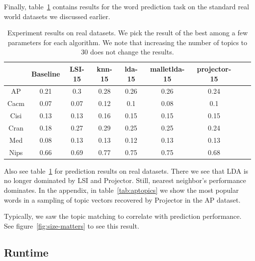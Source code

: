 Finally, table~\ref{tab:real} contains results for the word prediction
task on the standard real world datasets we discussed earlier.

\begin{table}[ht]
{\tiny

\begin{tabular}{|c|c|c|c|c|c|c|c|c|}
\hline 
 &Baseline &LSI-15 &knn-15 &lda-15 &malletlda-15 &projector-15 \\
 \hline 
AP &0.21 &0.3 &0.28 &0.26 &0.26 &0.24 \\
 \hline 
Cacm &0.07 &0.07 &0.12 &0.1 &0.08 &0.1 \\
 \hline 
Cisi &0.13 &0.13 &0.16 &0.15 &0.15 &0.15 \\
 \hline 
Cran &0.18 &0.27 &0.29 &0.25 &0.25 &0.24 \\
 \hline 
Med &0.08 &0.13 &0.13 &0.12 &0.13 &0.13 \\
 \hline 
Nips &0.66 &0.69 &0.77 &0.75 &0.75 &0.68 \\
 \hline 

\end{tabular}

}
\caption{Experiment results on real datasets. We pick the result of the best among a few parameters for each algorithm. We note that increasing the number of topics to 30 does not change the results. }
\label{tab:real}
\end{table}


Also see table~\ref{tab:real} for prediction results on real datasets.  There we see that
LDA is no longer dominated by LSI and Projector.  Still,  nearest neighbor's performance
dominates.  In the appendix, in table~\ref{tab:aptopics} we show the most popular
words in a sampling of topic vectors recovered by Projector in the AP dataset.

Typically, we saw the topic matching to correlate with prediction performance.
See figure~\ref{fig:size-matters} to see this result. 


\subsection{Runtime}

